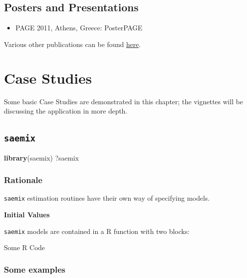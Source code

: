 \documentclass[]{book}
\newenvironment{Shaded}{\begin{snugshade}}{\end{snugshade}}
\newcommand{\KeywordTok}[1]{\textcolor[rgb]{0.13,0.29,0.53}{\textbf{{#1}}}}
\newcommand{\NormalTok}[1]{{#1}}
\providecommand{\tightlist}{%
  \setlength{\itemsep}{0pt}\setlength{\parskip}{0pt}}
\begin{document}
\section{Posters and Presentations}\label{posters-and-presentations}

\begin{itemize}
\tightlist
\item
  PAGE 2011, Athens, Greece: PosterPAGE
\end{itemize}

Various other publications can be found
\href{https://github.com/saemixdevelopment/Publications}{here}.

\chapter{Case Studies}\label{casestudies}

Some basic Case Studies are demonstrated in this chapter; the vignettes
will be discussing the application in more depth.

\section{\texorpdfstring{\texttt{saemix}}{saemix}}\label{saemix-1}

\begin{Shaded}
\begin{Highlighting}[]
\KeywordTok{library}\NormalTok{(saemix)}
\NormalTok{?saemix}
\end{Highlighting}
\end{Shaded}

\subsection{Rationale}\label{rationale}

\texttt{saemix} estimation routines have their own way of specifying
models.

\textbf{Initial Values}

\texttt{saemix} models are contained in a R function with two blocks:

\begin{Shaded}
\begin{Highlighting}[]
\NormalTok{Some R Code}
\end{Highlighting}
\end{Shaded}

\subsection{Some examples}\label{some-examples}
\end{document}

